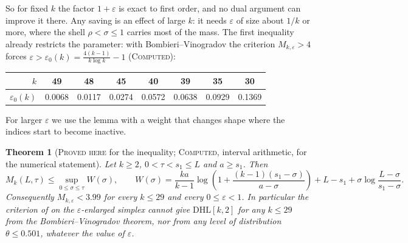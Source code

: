 \documentclass[11pt]{amsart}
\newtheorem{theorem}{Theorem}
\theoremstyle{definition}
\theoremstyle{remark}
\newcommand{\lbl}[1]{\textup{\textsc{#1}}}
\newcommand{\DHL}{\mathrm{DHL}}
\begin{document}
So for fixed $k$ the factor $1+\varepsilon$ is exact to first order, and no
dual argument can improve it there. Any saving is an effect of large $k$: it
needs $\varepsilon$ of size about $1/k$ or more, where the shell
$\rho<\sigma\le1$ carries most of the mass. The first inequality already
restricts the parameter: with Bombieri--Vinogradov the criterion
$M_{k,\varepsilon}>4$ forces
$\varepsilon>\varepsilon_0(k)=\frac{4(k-1)}{k\log k}-1$ (\lbl{Computed}):
\begin{center}
\begin{tabular}{@{}rccccccc@{}}
\toprule
$k$ & 49 & 48 & 45 & 40 & 39 & 35 & 30\\
\midrule
$\varepsilon_0(k)$ & 0.0068 & 0.0117 & 0.0274 & 0.0572 & 0.0638 & 0.0929 & 0.1369\\
\bottomrule
\end{tabular}
\end{center}

For larger $\varepsilon$ we use the lemma with a weight that changes shape
where the indices start to become inactive.

\begin{theorem}[\lbl{Proved here} for the inequality; \lbl{Computed}, interval arithmetic, for the numerical statement]\label{thm:floor}
Let $k\ge2$, $0<\tau<s_1\le L$ and $a\ge s_1$. Then
\[
M_k(L,\tau)\le\sup_{0\le\sigma\le\tau}W(\sigma),\qquad
W(\sigma)=\frac{ka}{k-1}\log\left(1+\frac{(k-1)(s_1-\sigma)}{a-\sigma}\right)+L-s_1+\sigma\log\frac{L-\sigma}{s_1-\sigma}.
\]
Consequently $M_{k,\varepsilon}<3.99$ for every $k\le29$ and every
$0\le\varepsilon<1$. In particular the criterion of \cite[Thm.~3.12]{Pol14b}
on the $\varepsilon$-enlarged simplex cannot give $\DHL[k,2]$ for any
$k\le29$ from the Bombieri--Vinogradov theorem, nor from any level of
distribution $\theta\le0.501$, whatever the value of $\varepsilon$.
\end{theorem}
\end{document}

